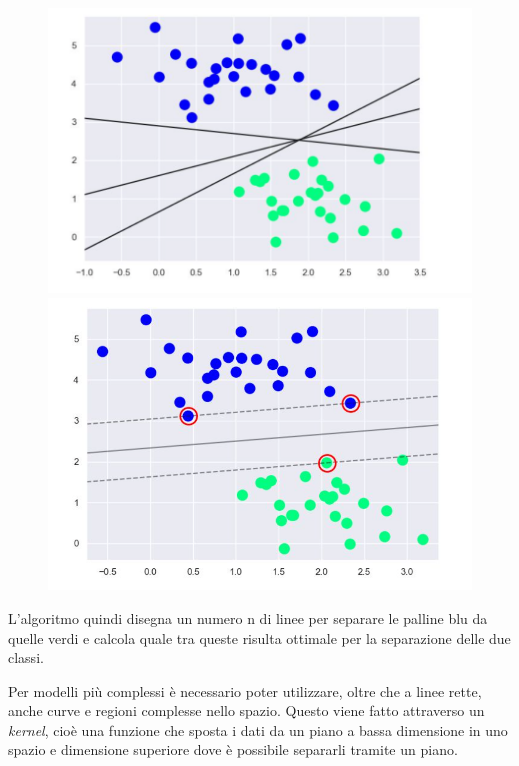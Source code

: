 \documentclass[12pt,a4paper]{article}
\begin{document}
\begin{figure}[!htb]
   \begin{minipage}{0.48\textwidth}
     \centering
     \includegraphics[width=.9\linewidth]{svc.png}
     \caption{}
   \end{minipage}\hfill
   \begin{minipage}{0.48\textwidth}
     \centering
     \includegraphics[width=.9\linewidth]{svc_margin.png}
     \caption{}
   \end{minipage}
\end{figure}

L'algoritmo quindi disegna un numero n di linee per separare le palline blu da quelle verdi e calcola quale tra queste risulta ottimale per la separazione delle due classi.

Per modelli più complessi è necessario poter utilizzare, oltre che a linee rette, anche curve e regioni complesse nello spazio.
Questo viene fatto attraverso un \textit{kernel}, cioè una funzione che sposta i dati da un piano a bassa dimensione in uno spazio e dimensione superiore dove è possibile separarli tramite un piano.
\end{document}
